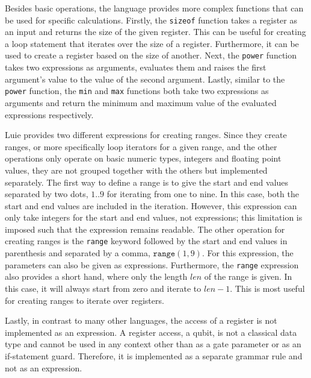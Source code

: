 Besides basic operations, the language provides more complex functions that can be used for specific calculations. Firstly, the \texttt{sizeof} function takes a register as an input and returns the size of the given register. This can be useful for creating a loop statement that iterates over the size of a register. Furthermore, it can be used to create a register based on the size of another. Next, the \texttt{power} function takes two expressions as arguments, evaluates them and raises the first argument's value to the value of the second argument. Lastly, similar to the \texttt{power} function, the \texttt{min} and \texttt{max} functions both take two expressions as arguments and return the minimum and maximum value of the evaluated expressions respectively.    

Luie provides two different expressions for creating ranges. Since they create ranges, or more specifically loop iterators for a given range, and the other operations only operate on basic numeric types, \eg integers and floating point values, they are not grouped together with the others but implemented separately. The first way to define a range is to give the start and end values separated by two dots, \eg $1\texttt{..}9$ for iterating from one to nine. In this case, both the start and end values are included in the iteration. However, this expression can only take integers for the start and end values, not expressions; this limitation is imposed such that the expression remains readable. The other operation for creating ranges is the \texttt{range} keyword followed by the start and end values in parenthesis and separated by a comma, \eg $\texttt{range}(1, 9)$. For this expression, the parameters can also be given as expressions. Furthermore, the \texttt{range} expression also provides a short hand, where only the length $len$ of the range is given. In this case, it will always start from zero and iterate to $len - 1$. This is most useful for creating ranges to iterate over registers. 

Lastly, in contrast to many other languages, the access of a register is not implemented as an expression. A register access, \ie a qubit, is not a classical data type and cannot be used in any context other than as a gate parameter or as an if-statement guard. Therefore, it is implemented as a separate grammar rule and not as an expression.


